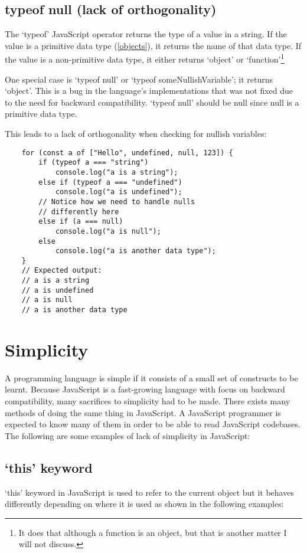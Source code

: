 \documentclass[11pt,a4paper]{article}
\begin{document}
\subsection{typeof null (lack of orthogonality)}
The `typeof' JavaScript operator returns the type of a value in a string.
If the value is a primitive data type (\ref{objects}), it returns the name of that data type.
If the value is a non-primitive data type, it either returns `object' or
`function'\footnote{It does that although a function is an object, but that is another matter I will not discuss.}

One special case is `typeof null' or `typeof someNullishVariable'; it returns `object'.
This is a bug in the language's implementations that was not fixed due to the need for backward compatibility.
`typeof null' should be null since null is a primitive data type.

This leads to a lack of orthogonality when checking for nullish variables:
\begin{verbatim}
    for (const a of ["Hello", undefined, null, 123]) {
        if (typeof a === "string")
            console.log("a is a string");
        else if (typeof a === "undefined")
            console.log("a is undefined");
        // Notice how we need to handle nulls
        // differently here
        else if (a === null)
            console.log("a is null");
        else
            console.log("a is another data type");
    }
    // Expected output:
    // a is a string
    // a is undefined
    // a is null
    // a is another data type
\end{verbatim}

\section{Simplicity}
A programming language is simple if it consists of a small set of constructs to be learnt.
Because JavaScript is a fast-growing language with focus on backward compatibility,
many sacrifices to simplicity had to be made.
There exists many methods of doing the same thing in JavaScript.
A JavaScript programmer is expected to know many of them in order to be able to read JavaScript codebases.
The following are some examples of lack of simplicity in JavaScript:

\subsection{`this' keyword}
`this' keyword in JavaScript is used to refer to the current object but it behaves differently depending on where
it is used as shown in the following examples:
\end{document}
